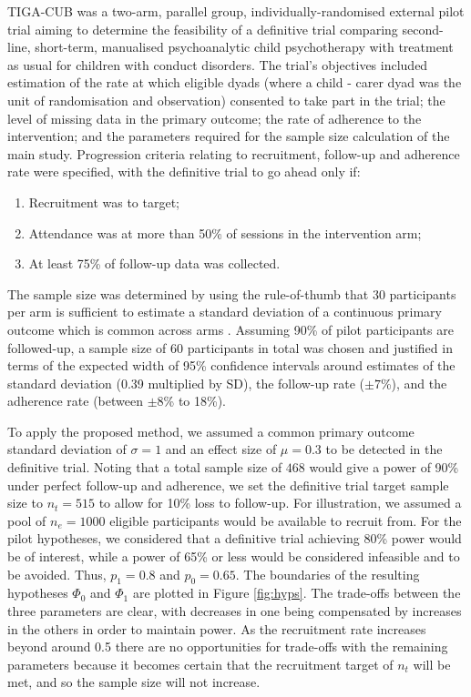 \documentclass[AMA,STIX1COL]{WileyNJD-v2}
\begin{document}
TIGA-CUB was a two-arm, parallel group, individually-randomised external pilot trial aiming to determine the feasibility of a definitive trial comparing second-line, short-term, manualised psychoanalytic child psychotherapy with treatment as usual for children with conduct disorders. The trial's objectives included estimation of the rate at which eligible dyads (where a child - carer dyad was the unit of randomisation and observation) consented to take part in the trial; the level of missing data in the primary outcome; the rate of adherence to the intervention; and the parameters required for the sample size calculation of the main study. Progression criteria relating to recruitment, follow-up and adherence rate were specified, with the definitive trial to go ahead only if:
\begin{enumerate}
\item Recruitment was to target;
\item Attendance was at more than 50\% of sessions in the intervention arm;
\item At least 75\% of follow-up data was collected.
\end{enumerate}

The sample size was determined by using the rule-of-thumb that 30 participants per arm is sufficient to estimate a standard deviation of a continuous primary outcome which is common across arms \cite{Lancaster2004}. Assuming 90\% of pilot participants are followed-up, a sample size of 60 participants in total was chosen and justified in terms of the expected width of 95\% confidence intervals around estimates of the standard deviation (0.39 multiplied by SD), the follow-up rate ($\pm 7$\%), and the adherence rate (between $\pm 8$\% to 18\%).

To apply the proposed method, we assumed a common primary outcome standard deviation of $\sigma = 1$ and an effect size of $\mu = 0.3$ to be detected in the definitive trial. Noting that a total sample size of  $468$ would give a power of 90\% under perfect follow-up and adherence, we set the definitive trial target sample size to $n_t = 515$ to allow for 10\% loss to follow-up. For illustration, we assumed a pool of $n_e = 1000$ eligible participants would be available to recruit from. For the pilot hypotheses, we considered that a definitive trial achieving 80\% power would be of interest, while a power of 65\% or less would be considered infeasible and to be avoided. Thus, $p_1 = 0.8$ and $p_0 = 0.65$. The boundaries of the resulting hypotheses $\Phi_0$ and $\Phi_1$ are plotted in Figure \ref{fig:hyps}. The trade-offs between the three parameters are clear, with decreases in one being compensated by increases in the others in order to maintain power. As the recruitment rate increases beyond around 0.5 there are no opportunities for trade-offs with the remaining parameters because it becomes certain that the recruitment target of $n_t$ will be met, and so the sample size will not increase.
\end{document}
